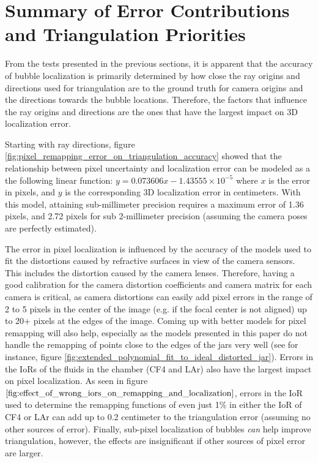 \documentclass[11pt, letterpaper]{extarticle} %
\begin{document}
\section{Summary of Error Contributions and Triangulation Priorities} \label{sec:summary_of_error_contributions}
From the tests presented in the previous sections, it is apparent that the accuracy of bubble localization is primarily determined by how close the ray origins and directions used for triangulation are to the ground truth for camera origins and the directions towards the bubble locations. Therefore, the factors that influence the ray origins and directions are the ones that have the largest impact on 3D localization error. 

Starting with ray directions, figure \ref{fig:pixel_remapping_error_on_triangulation_accuracy} showed that the relationship between pixel uncertainty and localization error can be modeled as a the following linear function: $y = 0.073606x - 1.43555\times 10^{-5}$ where $x$ is the error in pixels, and $y$ is the corresponding 3D localization error in centimeters. With this model, attaining sub-millimeter precision requires a maximum error of 1.36 pixels, and 2.72 pixels for sub 2-millimeter precision (assuming the camera poses are perfectly estimated). 

The error in pixel localization is influenced by the accuracy of the models used to fit the distortions caused by refractive surfaces in view of the camera sensors. This includes the distortion caused by the camera lenses. Therefore, having a good calibration for the camera distortion coefficients and camera matrix for each camera is critical, as camera distortions can easily add pixel errors in the range of 2 to 5 pixels in the center of the image (e.g. if the focal center is not aligned) up to 20+ pixels at the edges of the image. Coming up with better models for pixel remapping will also help, especially as the models presented in this paper do not handle the remapping of points close to the edges of the jars very well (see for instance, figure \ref{fig:extended_polynomial_fit_to_ideal_distorted_jar}). Errors in the IoRs of the fluids in the chamber (CF4 and LAr) also have the largest impact on pixel localization. As seen in figure $\ref{fig:effect_of_wrong_iors_on_remapping_and_localization}$, errors in the IoR used to determine the remapping functions of even just 1\% in either the IoR of CF4 or LAr can add up to 0.2 centimeter to the triangulation error (assuming no other sources of error). Finally, sub-pixel localization of bubbles \textit{can} help improve triangulation, however, the effects are insignificant if other sources of pixel error are larger.
\end{document}
